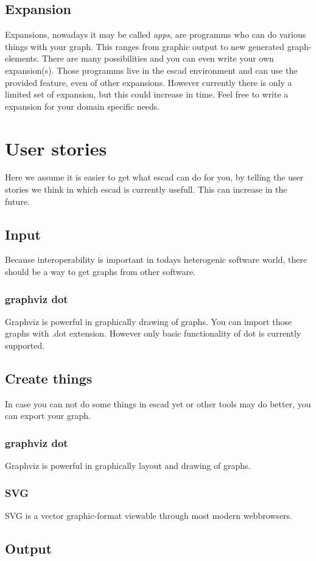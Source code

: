 \documentclass[a4paper, 12pt, openany]{scrbook}
\begin{document}
\section{Expansion}
Expansions, nowadays it may be called \emph{apps}, are programms who can do various things with your graph. This ranges from graphic output to new generated graph-elements. There are many possibilities and you can even write your own expansion(s). Those programms live in the escad environment and can use the provided feature, even of other expansions. However currently there is only a limited set of expansion, but this could increase in time. Feel free to write a expansion for your domain specific needs.
\chapter{User stories}
Here we assume it is easier to get what escad can do for you, by telling the user stories we think in which escad is currently usefull. This can increase in the future.
\section{Input}
Because interoperability is important in todays heterogenic software world, there should be a way to get graphs from other software.
\subsection{graphviz dot}
Graphviz is powerful in graphically drawing of graphs. You can import those graphs with .dot extension. However only basic functionality of dot is currently supported.
\section{Create things}
In case you can not do some things in escad yet or other tools may do better, you can export your graph.
\subsection{graphviz dot}
Graphviz is powerful in graphically layout and drawing of graphs.
\subsection{SVG}
SVG is a vector graphic-format viewable through most modern webbrowsers.
\section{Output}
\end{document}
